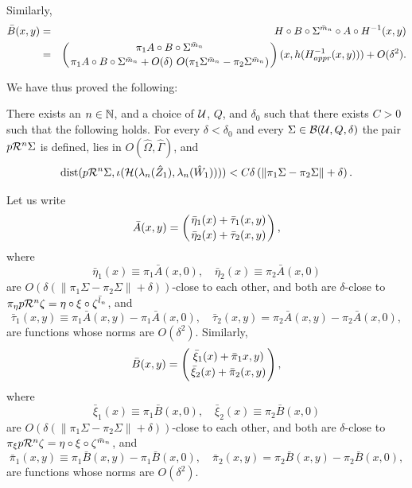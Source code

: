 Similarly,
\begin{eqnarray}
\nonumber \bar{B}(x,y)&=& H \circ B \circ \Sigma^{\bar m_n}\circ A \circ H^{-1}(x,y) \\
\nonumber &=&\left( { \pi_1 A \circ B \circ \Sigma^{\bar m_n} \atop  \pi_1 A \circ B \circ \Sigma^{\bar m_n} + O(\delta) \ O\!\left({\pi_1 \Sigma^{\bar m_n}} -{\pi_2 \Sigma^{\bar m_n} }\right)} \right)(x,h(H^{-1}_{appr}(x,y)))+O(\delta^2).
\end{eqnarray}

\noindent
We have thus proved the following:
\begin{lem}
\label{lem-preren}
There exists an $n \in {\Bbb N}$, and a choice of $\mathcal{U}$, $Q$, and $\delta_0$ such that there exists $C>0$ such that the following holds. For every $\delta<\delta_0$ and every $\Sigma\in\mathcal{B}(\mathcal{U},Q,\delta)$ the pair $p\mathcal{R}^n\Sigma$ is defined, lies in $O(\hat\Omega,\hat\Gamma)$, and 
$${\rm dist} { ( }p \mathcal{R}^n \Sigma, \iota(\mathcal{H}(\lambda_n(\hat Z_1),\lambda_n(\hat W_1))))<C \delta \left( \|\pi_1 \Sigma -\pi_2 \Sigma \|  +\delta \right).$$
\end{lem}

Let us write
\begin{equation}
\bar{A}(x,y)=\left( { \bar \eta_1(x)+\bar \tau_1(x,y) \atop   \bar \eta_2(x)+\bar \tau_2(x,y) } \right),
\end{equation}
where 
$$\bar \eta_1(x) \equiv \pi_1 \bar{A}(x,0), \quad  \bar \eta_2(x) \equiv \pi_2 \bar{A}(x,0)$$
are $O\left( \delta \left( \|\pi_1 \Sigma -\pi_2 \Sigma \|  +\delta \right) \right)$-close to each other, and both are $\delta$-close to $\pi_\eta p \mathcal{R}^n \zeta=\eta \circ \xi \circ \zeta^{\bar l_n}$, and 
$$\bar \tau_1(x,y) \equiv  \pi_1 \bar{A}(x,y)- \pi_1 \bar{A}(x,0), \quad \bar \tau_2(x,y)= \pi_2 \bar{A}(x,y)- \pi_2 \bar{A}(x,0),$$
are functions whose norms are $O(\delta^2)$. Similarly,
$$
\nonumber \bar{B}(x,y)=\left( { \bar \xi_1(x)+\bar \pi_1x,y) \atop   \bar \xi_2(x)+\bar \pi_2(x,y) } \right),
$$
where
$$\bar \xi_1(x) \equiv \pi_1 \bar{B}(x,0), \quad  \bar \xi_2(x) \equiv \pi_2 \bar{B}(x,0)$$
are $O\left( \delta \left( \|\pi_1 \Sigma -\pi_2 \Sigma \|  +\delta \right) \right)$-close to each other, and both are $\delta$-close to $\pi_\xi p \mathcal{R}^n \zeta=\eta \circ \xi \circ \zeta^{\bar m_n}$, and 
$$\bar \pi_1(x,y) \equiv  \pi_1 \bar{B}(x,y)- \pi_1 \bar{B}(x,0), \quad \bar \pi_2(x,y)= \pi_2 \bar{B}(x,y)- \pi_2 \bar{B}(x,0),$$
are functions whose norms are $O(\delta^2)$.




